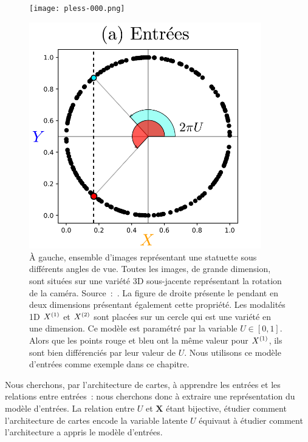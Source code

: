 \documentclass[../main]{subfiles}
\begin{document}
\begin{figure}
    \begin{minipage}{0.4\textwidth}
    \centering
    \texttt{[image: pless-000.png]}
    \end{minipage}
    \begin{minipage}{0.6\textwidth}
    \centering
    \includegraphics[width=0.9\textwidth]{2som_inp.pdf}
    \end{minipage}
    \caption{
        \`A gauche, ensemble d'images représentant une statuette sous différents angles de vue. Toutes les images, de grande dimension, sont situées sur une variété 3D sous-jacente représentant la rotation de la caméra. Source~:~\cite{Pless2009ASO}.
       La figure de droite présente le pendant en deux dimensions présentant également cette propriété. Les modalités 1D $X^{({1})}$ et $X^{({2})}$ sont placées sur un cercle qui est une variété en une dimension. Ce modèle est paramétré par la variable $U \in [0,1]$. Alors que les points rouge et bleu ont la même valeur pour $X^{({1})}$, ils sont bien différenciés par leur valeur de $U$.
       Nous utilisons ce modèle d'entrées comme exemple dans ce chapitre.
       \label{fig:U}}
\end{figure}

Nous cherchons, par l'architecture de cartes, à apprendre les entrées et les relations entre entrées~: nous cherchons donc à extraire une représentation du modèle d'entrées. La relation entre $U$ et $\mathbf{X}$ étant bijective, étudier comment l'architecture de cartes encode la variable latente $U$ équivaut à étudier comment l'architecture a appris le modèle d'entrées.
\end{document}
